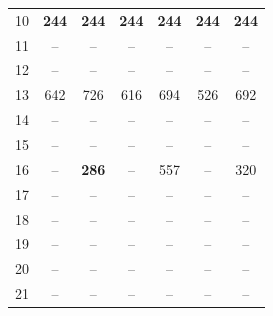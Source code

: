 \begin{table}[H]
{\begin{tabular}{ccccccc}
                10 & \textbf{244} &     \textbf{244} &  \textbf{244} &  \textbf{244} &  \textbf{244} &  \textbf{244} \\

                11 & -- &       -- &    -- &    -- &    -- &    -- \\
                12 & -- &       -- &    -- &    -- &    -- &    -- \\
                13 & 642 &      726 &   616 &   694 &   526 &   692 \\
                14 & -- &       -- &    -- &    -- &    -- &    -- \\
                15 & -- &       -- &    -- &    -- &    -- &    -- \\
                16 & -- &       \textbf{286} &  -- &    557 &   -- &    320 \\
                17 & -- &       -- &    -- &    -- &    -- &    -- \\
                18 & -- &       -- &    -- &    -- &    -- &    -- \\
                19 & -- &       -- &    -- &    -- &    -- &    -- \\
                20 & -- &       -- &    -- &    -- &    -- &    -- \\
                21 & -- &       -- &    -- &    -- &    -- &    -- \\
                \bottomrule
        \end{tabular}}
\end{table}